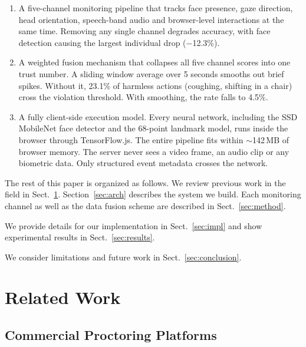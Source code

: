\documentclass[runningheads]{llncs}
\begin{document}
\begin{enumerate}
    \item A five-channel monitoring pipeline that tracks face presence, gaze direction, head orientation, speech-band audio and browser-level interactions at the same time. Removing any single channel degrades accuracy, with face detection causing the largest individual drop ($-$12.3\%).
    \item A weighted fusion mechanism that collapses all five channel scores into one trust number. A sliding window average over 5 seconds smooths out brief spikes. Without it, 23.1\% of harmless actions (coughing, shifting in a chair) cross the violation threshold. With smoothing, the rate falls to 4.5\%.
    \item A fully client-side execution model. Every neural network, including the SSD MobileNet face detector and the 68-point landmark model, runs inside the browser through TensorFlow.js. The entire pipeline fits within $\sim$142\,MB of browser memory. The server never sees a video frame, an audio clip or any biometric data. Only structured event metadata crosses the network.
\end{enumerate}

The rest of this paper is organized as follows. We review previous work in the field in Sect.~\ref{sec:related}. Section~\ref{sec:arch} describes the system we build. Each monitoring channel as well as the data fusion scheme are described in Sect.~\ref{sec:method}.

We provide details for our implementation in Sect.~\ref{sec:impl} and show experimental results in Sect.~\ref{sec:results}.

We consider limitations and future work in Sect.~\ref{sec:conclusion}.

\section{Related Work}\label{sec:related}

\subsection{Commercial Proctoring Platforms}
\end{document}
